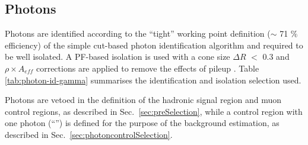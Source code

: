 \subsection{Photons}
\label{sec:photon-id}

Photons are identified according to the ``tight'' working point
definition ($\sim$ 71 $\%$ efficiency) of the simple cut-based photon
identification algorithm \cite{photon-id} and required to be well
isolated.  A PF-based isolation is used with a cone size $\Delta R$
$<$ 0.3 and $\rho\times A_{eff}$ corrections are applied to remove the
effects of pileup \cite{pf-photon}.  Table \ref{tab:photon-id-gamma}
summarises the identification and isolation selection used.

Photons are vetoed in the definition of the hadronic signal region and
muon control regions, as described in Sec.~\ref{sec:preSelection},
while a control region with one photon (``\gj'') is defined for the
purpose of the background estimation, as described in
Sec.~\ref{sec:photoncontrolSelection}.

